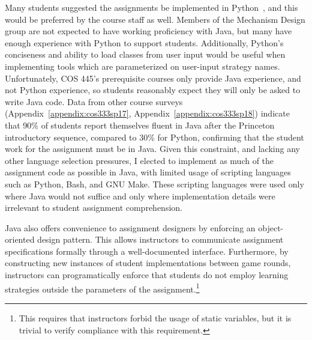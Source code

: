 \documentclass[pageno]{jpaper}
\begin{document}
Many students suggested the assignments be implemented in Python~\cite{survey12, survey34}, and this would be preferred by the course staff as well.
Members of the Mechanism Design group are not expected to have working proficiency with Java, but many have enough experience with Python to support students.
Additionally, Python's conciseness and ability to load classes from user input would be useful when implementing tools which are parameterized on user-input strategy names.
Unfortunately, COS 445's prerequisite courses only provide Java experience, and not Python experience, so students reasonably expect they will only be asked to write Java code.
Data from other course surveys (Appendix~\ref{appendix:cos333sp17}, Appendix~\ref{appendix:cos333sp18}) indicate that 90\% of students report themselves fluent in Java after the Princeton introductory sequence, compared to 30\% for Python, confirming that the student work for the assignment must be in Java.
Given this constraint, and lacking any other language selection pressures, I elected to implement as much of the assignment code as possible in Java, with limited usage of scripting languages such as Python, Bash, and GNU Make.
These scripting languages were used only where Java would not suffice and only where implementation details were irrelevant to student assignment comprehension.

Java also offers convenience to assignment designers by enforcing an object-oriented design pattern.
This allows instructors to communicate assignment specifications formally through a well-documented interface.
Furthermore, by constructing new instances of student implementations between game rounds, instructors can programatically enforce that students do not employ learning strategies outside the parameters of the assignment.\footnote{This requires that instructors forbid the usage of static variables, but it is trivial to verify compliance with this requirement.}
\end{document}
